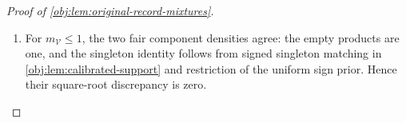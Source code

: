 \begin{proof}[Proof of \cref{obj:lem:original-record-mixtures}]
\begin{enumerate}
Define the component affinities and conditional discrepancy by
\[
\begin{aligned}
\mathfrak a_{\mathcal V}^{\mathrm{fair}}
&=
4^{-m_{\mathcal V}}\sum_{\boldsymbol l_{\mathcal V}}
\sqrt{\mathsf L_{t,\mathcal V}^{\mathrm{fair}}
\mathsf L_{*,\mathcal V}^{\mathrm{fair}}},\\
\mathsf h_{\mathrm{fair}}(\mathbf x;\delta_{\mathrm{aux}})
&=
\int
\left(
\sqrt{\mathsf L_t^{\mathrm{fair}}}
-\sqrt{\mathsf L_*^{\mathrm{fair}}}
\right)^2\,d\tau^{\otimes n}.
\end{aligned}
\]
Expanding the squared difference and using normalization gives
\(0\le\mathfrak a_{\mathcal V}^{\mathrm{fair}}\le1\) and
\[
\begin{aligned}
\mathsf h_{\mathrm{fair}}(\mathbf x;\delta_{\mathrm{aux}})
&=2\left(1-\prod_{\mathcal V}
\mathfrak a_{\mathcal V}^{\mathrm{fair}}\right)\\
&\le
2\sum_{\mathcal V}(1-\mathfrak a_{\mathcal V}^{\mathrm{fair}})\\
&=
\sum_{\mathcal V\in\mathscr B_{\mathbf x}}
4^{-m_{\mathcal V}}\sum_{\boldsymbol l_{\mathcal V}}
\left(
\sqrt{\mathsf L_{t,\mathcal V}^{\mathrm{fair}}}
-\sqrt{\mathsf L_{*,\mathcal V}^{\mathrm{fair}}}
\right)^2.
\end{aligned}
\]
Here the affinity factors by finite distributivity, and the inequality
is the finite-product inequality for numbers in \([0,1]\).
The common covariate marginal also gives
\[
\mathcal H^2(Q_t,P_{*,t,\delta_{\mathrm{aux}}}^{\otimes n})
=
\int\mathsf h_{\mathrm{fair}}(\mathbf x;\delta_{\mathrm{aux}})
\,d\lambda^{\otimes n}(\mathbf x),
\]
where \(Q_t\) in this display is evaluated at the auxiliary amplitude.

\item For \(m_{\mathcal V}\le1\), the two fair component densities agree:
the empty products are one, and the singleton identity follows from
signed singleton matching in \cref{obj:lem:calibrated-support} and
restriction of the uniform sign prior. Hence their square-root
discrepancy is zero.


\end{enumerate}
\end{proof}
